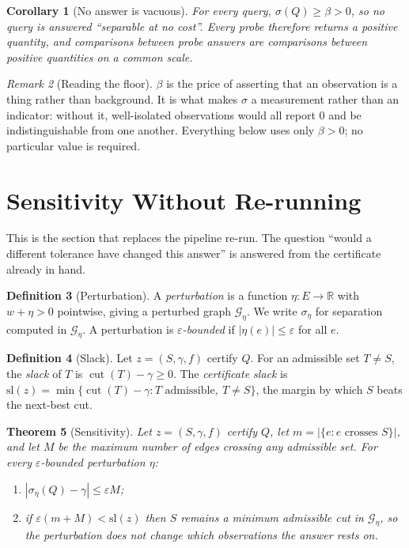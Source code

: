 \documentclass[11pt,a4paper]{article}
\newtheorem{theorem}{Theorem}[section]
\newtheorem{corollary}[theorem]{Corollary}
\theoremstyle{definition}
\newtheorem{definition}[theorem]{Definition}
\theoremstyle{remark}
\newtheorem{remark}[theorem]{Remark}
\newcommand{\Gph}{\mathcal{G}}
\newcommand{\wt}{w}
\newcommand{\flo}{\beta}
\newcommand{\cut}{\operatorname{cut}}
\newcommand{\sep}{\sigma}
\begin{document}
\begin{corollary}[No answer is vacuous]\label{cor:informative}
For every query, $\sep(Q) \geq \flo > 0$, so no query is answered
``separable at no cost''. Every probe therefore returns a positive
quantity, and comparisons between probe answers are comparisons between
positive quantities on a common scale.
\end{corollary}

\begin{remark}[Reading the floor]\label{rem:floor}
$\flo$ is the price of asserting that an observation is a thing rather
than background. It is what makes $\sep$ a measurement rather than an
indicator: without it, well-isolated observations would all report $0$
and be indistinguishable from one another. Everything below uses only
$\flo > 0$; no particular value is required.
\end{remark}

\section{Sensitivity Without Re-running}
\label{sec:sensitivity}

This is the section that replaces the pipeline re-run. The question
``would a different tolerance have changed this answer'' is answered from
the certificate already in hand.

\begin{definition}[Perturbation]\label{def:perturb}
A \emph{perturbation} is a function $\eta : E \to \mathbb{R}$ with
$\wt + \eta > 0$ pointwise, giving a perturbed graph $\Gph_\eta$. We
write $\sep_\eta$ for separation computed in $\Gph_\eta$. A perturbation
is \emph{$\varepsilon$-bounded} if $|\eta(e)| \leq \varepsilon$ for all
$e$.
\end{definition}

\begin{definition}[Slack]\label{def:slack}
Let $z = (S,\gamma,f)$ certify $Q$. For an admissible set $T \neq S$, the
\emph{slack} of $T$ is $\cut(T) - \gamma \geq 0$. The \emph{certificate
slack} is
$\mathrm{sl}(z) = \min\{\cut(T) - \gamma : T \text{ admissible},\
T \neq S\}$, the margin by which $S$ beats the next-best cut.
\end{definition}

\begin{theorem}[Sensitivity]\label{thm:sensitivity}
Let $z = (S,\gamma,f)$ certify $Q$, let $m = |\{e : e \text{ crosses }
S\}|$, and let $M$ be the maximum number of edges crossing any admissible
set. For every $\varepsilon$-bounded perturbation $\eta$:
\begin{enumerate}[label=(\alph*)]
\item $|\sep_\eta(Q) - \gamma| \leq \varepsilon M$;
\item if $\varepsilon (m + M) < \mathrm{sl}(z)$ then $S$ remains a
minimum admissible cut in $\Gph_\eta$, so the perturbation does not
change which observations the answer rests on.
\end{enumerate}
\end{theorem}
\end{document}
